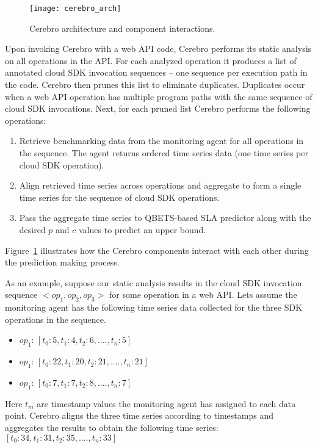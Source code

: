 \begin{figure}
\centering
\texttt{[image: cerebro\_arch]}
\caption{Cerebro architecture and component interactions.}
\label{fig:cerebro_arch}
\end{figure}

Upon invoking Cerebro with a web API code, Cerebro
performs its static analysis on all operations in the API. For each
analyzed operation it produces a list of annotated cloud SDK invocation sequences --
one sequence per execution path in the code.  Cerebro then prunes this list to eliminate duplicates.
Duplicates occur when a web API operation has
multiple program paths with the same sequence of cloud SDK invocations.
Next, for each pruned list Cerebro
performs the following operations:
\begin{enumerate}
\item Retrieve benchmarking data from the monitoring agent 
for all operations in the sequence. The agent returns
ordered time series data (one time series per cloud SDK operation).
\item Align retrieved time series across operations and aggregate
to form a single time series for the sequence of cloud SDK operations.
\item Pass the aggregate time series to QBETS-based SLA predictor along with the 
desired $p$ and $c$ values to predict an upper bound. 
\end{enumerate}

Figure~\ref{fig:cerebro_arch} illustrates how the Cerebro components interact with
each other during the prediction making process.

As an example, suppose our static analysis results in the
cloud SDK invocation sequence $<op_{1},op_{2},op_{3}>$ for
some operation in a web API. 
Lets assume the monitoring agent has the following
time series data collected for the three SDK operations in the sequence.
\begin{itemize}
\item $op_{1}$: $[t_{0}: 5, t_{1}: 4, t_{2}: 6, ...., t_{n}: 5]$
\item $op_{1}$: $[t_{0}: 22, t_{1}: 20, t_{2}: 21, ...., t_{n}: 21]$
\item $op_{1}$: $[t_{0}: 7, t_{1}: 7, t_{2}: 8, ...., t_{n}: 7]$
\end{itemize}

Here $t_{m}$ are timestamp values the monitoring agent has assigned to 
each data point. Cerebro aligns the three
time series according to timestamps 
and aggregates the results
to obtain the following time series:
$[t_{0}: 34, t_{1}: 31, t_{2}: 35, ...., t_{n}: 33]$

